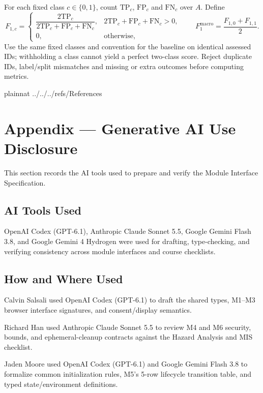 \documentclass[12pt, titlepage]{article}
\begin{document}
For each fixed class $c\in\{0,1\}$, count $\mathrm{TP}_c$, $\mathrm{FP}_c$ and $\mathrm{FN}_c$ over $A$. Define
\[
 F_{1,c}=\begin{cases}
 \dfrac{2\mathrm{TP}_c}{2\mathrm{TP}_c+\mathrm{FP}_c+\mathrm{FN}_c},
 &2\mathrm{TP}_c+\mathrm{FP}_c+\mathrm{FN}_c>0,\\
 0,&\text{otherwise},
 \end{cases}
 \qquad F_1^{\mathrm{macro}}=\frac{F_{1,0}+F_{1,1}}{2}.
\]
Use the same fixed classes and convention for the baseline on identical assessed IDs; withholding a class cannot yield a perfect two-class score. Reject duplicate IDs, label/split mismatches and missing or extra outcomes before computing metrics.

\clearpage

 {plainnat}
 {../../../refs/References}

\clearpage

\clearpage{}

\section{Appendix --- Generative AI Use Disclosure}

This section records the AI tools used to prepare and verify the Module Interface Specification.

\subsection{AI Tools Used}

\noindent OpenAI Codex (GPT-6.1), Anthropic Claude Sonnet 5.5, Google Gemini Flash 3.8, and Google Gemini 4 Hydrogen were used for drafting, type-checking, and verifying consistency across module interfaces and course checklists.

\subsection{How and Where Used}

\noindent Calvin Salsali used OpenAI Codex (GPT-6.1) to draft the shared types, M1--M3 browser interface signatures, and consent/display semantics.

\medskip\noindent Richard Han used Anthropic Claude Sonnet 5.5 to review M4 and M6 security, bounds, and ephemeral-cleanup contracts against the Hazard Analysis and MIS checklist.

\medskip\noindent Jaden Moore used OpenAI Codex (GPT-6.1) and Google Gemini Flash 3.8 to formalize common initialization rules, M5's 5-row lifecycle transition table, and typed state/environment definitions.
\end{document}
